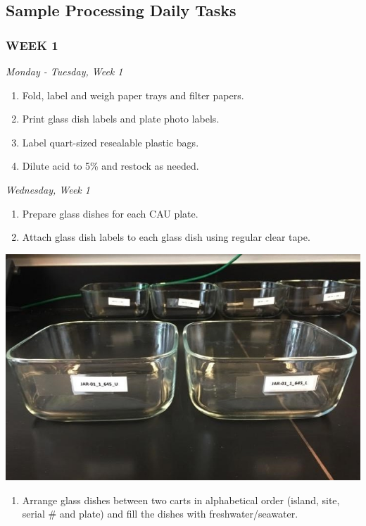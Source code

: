 \documentclass[
]{book}
\providecommand{\tightlist}{%
  \setlength{\itemsep}{0pt}\setlength{\parskip}{0pt}}
\begin{document}
\hypertarget{sample-processing-daily-tasks}{%
\subsection{Sample Processing Daily Tasks}\label{sample-processing-daily-tasks}}

\hypertarget{week-1}{%
\subsubsection{WEEK 1}\label{week-1}}

\emph{Monday - Tuesday, Week 1}

\begin{enumerate}
\def\labelenumi{\arabic{enumi}.}
\tightlist
\item
  Fold, label and weigh paper trays and filter papers.
\item
  Print glass dish labels and plate photo labels.
\item
  Label quart-sized resealable plastic bags.
\item
  Dilute acid to 5\% and restock as needed.
\end{enumerate}

\emph{Wednesday, Week 1}

\begin{enumerate}
\def\labelenumi{\arabic{enumi}.}
\tightlist
\item
  Prepare glass dishes for each CAU plate.
\item
  Attach glass dish labels to each glass dish using regular clear tape.
\end{enumerate}

\includegraphics{images/DailyTasks2.jpg}

\begin{enumerate}
\def\labelenumi{\arabic{enumi}.}
\setcounter{enumi}{2}
\tightlist
\item
  Arrange glass dishes between two carts in alphabetical order (island, site, serial \# and plate) and fill the dishes with freshwater/seawater.
\end{enumerate}
\end{document}
